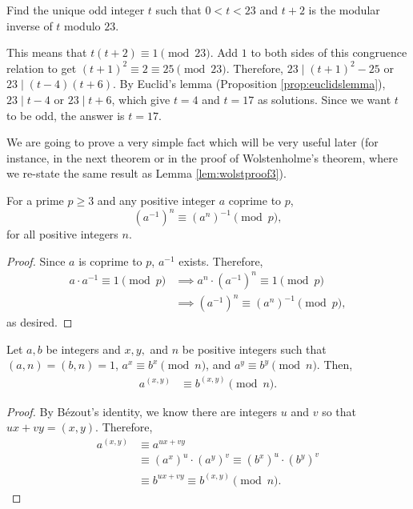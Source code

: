\documentclass{subfile}
\begin{document}
	\begin{problem}
		Find the unique odd integer $t$ such that $0<t<23$ and $t+2$ is the modular inverse of $t$ modulo $23$.
	\end{problem}

	\begin{solution}
		This means that $t(t+2)\equiv 1 \pmod{23}$. Add $1$ to both sides of this congruence relation to get $(t+1)^2 \equiv 2 \equiv 25\pmod{23}$. Therefore, $23\mid (t+1)^2-25$ or $23\mid (t-4)(t+6)$. By Euclid's lemma (Proposition \ref{prop:euclidslemma}), $23\mid t-4$ or $23\mid t+6$, which give $t=4$ and $t=17$ as solutions. Since we want $t$ to be odd, the answer is $t=17$.
	\end{solution}

We are going to prove a very simple fact which will be very useful later (for instance, in the next theorem or in the proof of Wolstenholme's theorem, where we re-state the same result as Lemma \ref{lem:wolstproof3}).

	\begin{proposition}\label{prop:inversepower}
		For a prime $p\geq 3$ and any positive integer $a$ coprime to $p$,
		\[ (a^{-1})^n \equiv (a^n)^{-1} \pmod p,\]
		for all positive integers $n$.
	\end{proposition}

	\begin{proof}
		Since $a$ is coprime to $p$, $a^{-1}$ exists. Therefore,
			\begin{align*}
				a \cdot a^{-1} \equiv 1 \pmod p &\implies a^n \cdot (a^{-1})^n \equiv 1 \pmod p\\
				&\implies (a^{-1})^n \equiv (a^n)^{-1} \pmod p,
			\end{align*}
		as desired.
	\end{proof}



	\begin{theorem}\label{thm:modgcd}
	Let $a,b$ be integers and $x,y,$ and $n$ be positive integers such that $(a,n)=(b,n)=1$,  $a^x\equiv b^x\pmod n$, and $a^y\equiv b^y\pmod n$. Then,
	\begin{align*}
		a^{(x,y)} & \equiv b^{(x,y)}\pmod n.
	\end{align*}
\end{theorem}

\begin{proof}
	By B\'{e}zout's identity, we know there are integers $u$ and $v$ so that $ux+vy=(x,y)$. Therefore,
	\begin{align}
		a^{(x,y)} &\equiv a^{ux+vy}\nonumber\\
		&\equiv \left(a^x\right)^u \cdot \left(a^y\right)^v \equiv \left(b^x\right)^u \cdot \left(b^y\right)^v\label{eq:modgcd}\\
		&\equiv b^{ux+vy} \equiv b^{(x,y)} \pmod n.\nonumber
	\end{align}
\end{proof}
\end{document}
